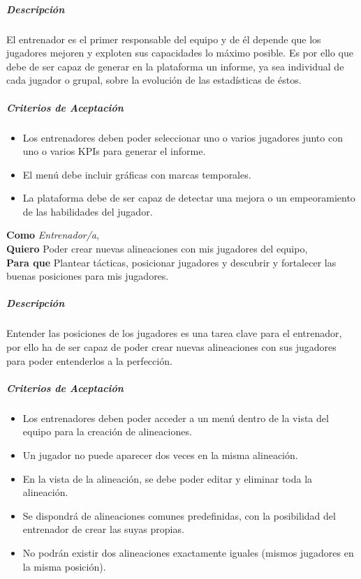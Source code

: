 \subparagraph{Descripción}
El entrenador es el primer responsable del equipo y de él depende que los jugadores mejoren y exploten sus capacidades lo máximo posible. Es por ello que debe de ser capaz de generar en la plataforma un informe, ya sea individual de cada jugador o grupal, sobre la evolución de las estadísticas de éstos.

\subparagraph{Criterios de Aceptación}
\begin{itemize}
    \item Los entrenadores deben poder seleccionar uno o varios jugadores junto con uno o varios KPIs para generar el informe.
    \item El menú debe incluir gráficas con marcas temporales.
    \item La plataforma debe de ser capaz de detectar una mejora o un empeoramiento de las habilidades del jugador.
\end{itemize}


\begin{tcolorbox}[title=Historia de Usuario 6: Alinear jugadores del Equipo]
\textbf{Como} \textit{Entrenador/a},\\
\textbf{Quiero} Poder crear nuevas alineaciones con mis jugadores del equipo,\\
\textbf{Para que} Plantear tácticas, posicionar jugadores y descubrir y fortalecer las buenas posiciones para mis jugadores.
\end{tcolorbox}

\subparagraph{Descripción}
Entender las posiciones de los jugadores es una tarea clave para el entrenador, por ello ha de ser capaz de poder crear nuevas alineaciones con sus jugadores para poder entenderlos a la perfección.

\subparagraph{Criterios de Aceptación}
\begin{itemize}
    \item Los entrenadores deben poder acceder a un menú dentro de la vista del equipo para la creación de alineaciones.
    \item Un jugador no puede aparecer dos veces en la misma alineación.
    \item En la vista de la alineación, se debe poder editar y eliminar toda la alineación.
    \item Se dispondrá de alineaciones comunes predefinidas, con la posibilidad del entrenador de crear las suyas propias.
    \item No podrán existir dos alineaciones exactamente iguales (mismos jugadores en la misma posición).
\end{itemize}

